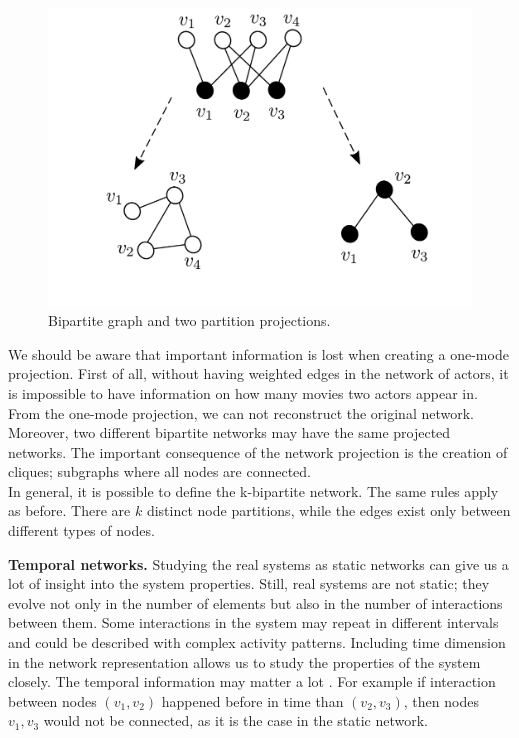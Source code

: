 \begin{figure}[!ht]
	\centering
	\includegraphics[width=0.7\linewidth]{figures/methodology/bipartite_graph.pdf} 
	\caption{Bipartite graph and two partition projections.}
	\label{fig:gt2}
\end{figure}

We should be aware that important information is lost when creating a one-mode projection. First of all, without having weighted edges in the network of actors, it is impossible to have information on how many movies two actors appear in. From the one-mode projection, we can not reconstruct the original network. Moreover, two different bipartite networks may have the same projected networks. The important consequence of the network projection is the creation of cliques; subgraphs where all nodes are connected. \\
In general, it is possible to define the k-bipartite network. The same rules apply as before. There are $k$ distinct node partitions, while the edges exist only between different types of nodes.




\textbf{Temporal networks.}
Studying the real systems as static networks can give us a lot of insight into the system properties. Still, real systems are not static; they evolve not only in the number of elements but also in the number of interactions between them. Some interactions in the system may repeat in different intervals and could be described with complex activity patterns. Including time dimension in the network representation allows us to study the properties of the system closely. The temporal information may matter a lot \cite{holme2012}. For example if interaction between nodes $(v_1, v_2)$ happened before in time than  $(v_2, v_3)$, then nodes $v_1, v_3$ would not be connected, as it is the case in the static network. 

